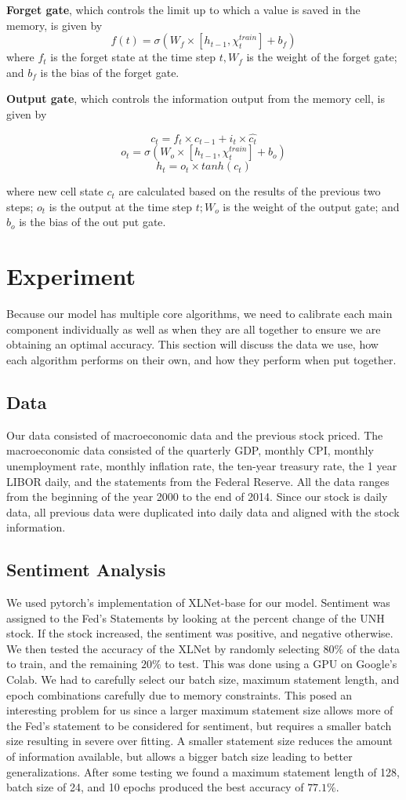 \documentclass{article}
\begin{document}
\textbf{Forget gate}, which controls the limit up to which a value is saved in the memory, is given by
$$f(t) = \sigma (W_{f} \times [h_{t-1}, \chi_{t}^{train}]+b_{f})$$
where $f_{t}$ is the forget state at the time step $t, W_{f}$ is the weight of the forget gate; and $b_{f}$ is the bias of the forget gate.

\textbf{Output gate}, which controls the information output from the memory cell, is given by

$$ c_{t} = f_{t} \times c_{t-1} + i_{t} \times \hat{c_{t}}$$
$$o_{t} = \sigma (W_{o} \times [h_{t-1}, \chi_{t}^{train}] + b_{o})$$
$$h_{t} = o_{t} \times tanh(c_{t})$$

where new cell state $c_{t}$ are calculated based on the results of the previous two steps; $o_{t}$ is the output at the time step $t; W_{o}$ is the weight of the output gate; and $b_{o}$ is the bias of the out put gate. \\

\section{Experiment}
Because our model has multiple core algorithms, we need to calibrate each main component individually as well as when they are all together to ensure we are obtaining an optimal accuracy. This section will discuss the data we use, how each algorithm performs on their own, and how they perform when put together.
\subsection{Data}
Our data consisted of macroeconomic data and the previous stock priced. The macroeconomic data consisted of the quarterly GDP, monthly CPI, monthly unemployment rate, monthly inflation rate, the ten-year treasury rate, the 1 year LIBOR daily, and the statements from the Federal Reserve. All the data ranges from the beginning of the year 2000 to the end of 2014. Since our stock is daily data, all previous data were duplicated into daily data and aligned with the stock information.
\subsection{Sentiment Analysis}
We used pytorch's implementation of XLNet-base for our model. Sentiment was assigned to the Fed's Statements by looking at the percent change of the UNH stock. If the stock increased, the sentiment was positive, and negative otherwise. We then tested the accuracy of the XLNet by randomly selecting $80\%$ of the data to train, and the remaining $20\%$ to test. This was done using a GPU on Google's Colab. We had to carefully select our batch size, maximum statement length, and epoch combinations carefully due to memory constraints. This posed an interesting problem for us since a larger maximum statement size allows more of the Fed's statement to be considered for sentiment, but requires a smaller batch size resulting in severe over fitting. A smaller statement size reduces the amount of information available, but allows a bigger batch size leading to better generalizations. After some testing we found a maximum statement length of 128, batch size of 24, and 10 epochs produced the best accuracy of $77.1\%$.
\end{document}
